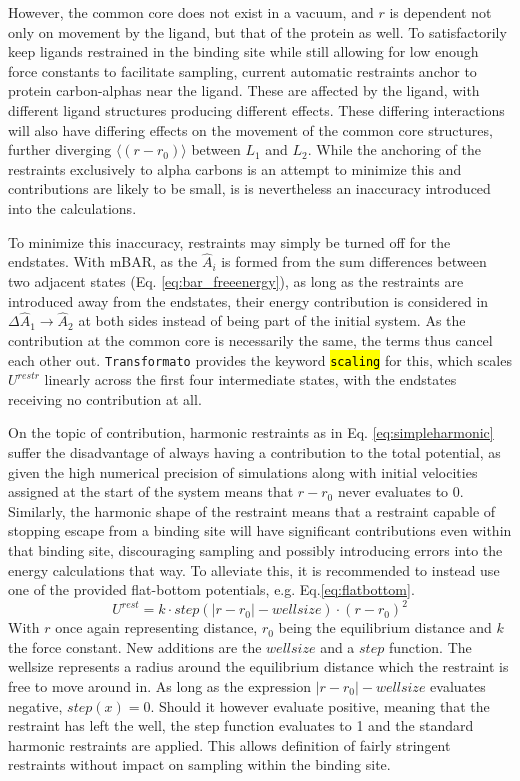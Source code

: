 \documentclass[oneside]{scrreprt}
\newcommand{\code}[1]{\texttt{\hl{#1}}}
\begin{document}
However, the common core does not exist in a vacuum, and $r$ is dependent not only on movement by the ligand, but that of the protein as well. To satisfactorily keep ligands restrained in the binding site while still allowing for low enough force constants to facilitate sampling, current automatic restraints anchor to protein carbon-alphas near the ligand. These are affected by the ligand, with different ligand structures producing different effects. These differing interactions will also have differing effects on the movement of the common core structures, further diverging $\langle (r-r_0) \rangle$ between $L_1$ and $L_2$. While the anchoring of the restraints exclusively to alpha carbons is an attempt to minimize this and contributions are likely to be small, is is nevertheless an inaccuracy introduced into the calculations.

To minimize this inaccuracy, restraints may simply be turned off for the endstates. With mBAR, as the $\hat{A}_i$ is formed from the sum differences between two adjacent states (Eq. \ref{eq:bar_freeenergy}), as long as the restraints are introduced away from the endstates, their energy contribution is considered in $\Delta \hat{A}_{1}\rightarrow \hat{A}_{2}$ at both sides instead of being part of the initial system. As the contribution at the common core is necessarily the same, the terms thus cancel each other out. \texttt{Transformato} provides the keyword \code{scaling} for this, which scales $U^{restr}$ linearly across the first four intermediate states, with the endstates receiving no contribution at all.

On the topic of contribution, harmonic restraints as in Eq. \ref{eq:simpleharmonic} suffer the disadvantage of always having a contribution to the total potential, as given the high numerical precision of simulations along with initial velocities assigned at the start of the system means that $r-r_0$ never evaluates to 0. Similarly, the harmonic shape of the restraint means that a restraint capable of stopping escape from a binding site will have significant contributions even within that binding site, discouraging sampling and possibly introducing errors into the energy calculations that way. To alleviate this, it is recommended to instead use one of the provided flat-bottom potentials, e.g. Eq.\ref{eq:flatbottom}.
\begin{equation}\label{eq:flatbottom}
    U^{rest}=k \cdot step(|r-r_0|-wellsize) \cdot (r-r_0)^2
\end{equation}
With $r$ once again representing distance, $r_0$ being the equilibrium distance and $k$ the force constant. New additions are the $wellsize$ and a $step$ function. The wellsize represents a radius around the equilibrium distance which the restraint is free to move around in. As long as the expression $|r-r_0|-wellsize$ evaluates negative, $step(x)=0$. Should it however evaluate positive, meaning that the restraint has left the well, the step function evaluates to 1 and the standard harmonic restraints are applied. This allows definition of fairly stringent restraints without impact on sampling within the binding site.
\end{document}
